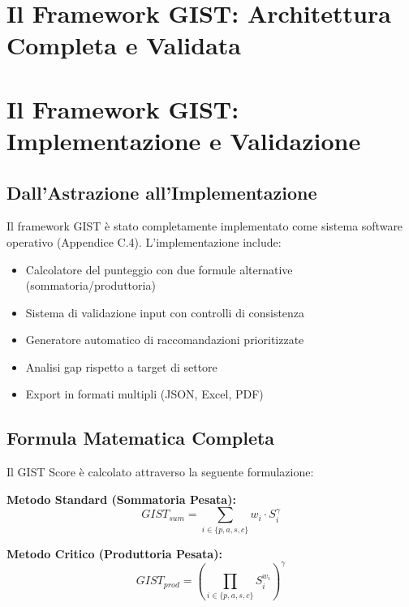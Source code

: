 \section{\texorpdfstring{Il Framework GIST: Architettura Completa e Validata}{5.3 - Il Framework GIST: Architettura Completa e Validata}}
\label{sec:5.3}

\section{\texorpdfstring{Il Framework GIST: Implementazione e Validazione}{5.3 - Il Framework GIST: Implementazione e Validazione}}

\subsection{\texorpdfstring{Dall'Astrazione all'Implementazione}{5.3.1 - Dall'Astrazione all'Implementazione}}

Il framework GIST è stato completamente implementato come sistema software operativo (Appendice C.4). L'implementazione include:

\begin{itemize}
\item Calcolatore del punteggio con due formule alternative (sommatoria/produttoria)
\item Sistema di validazione input con controlli di consistenza
\item Generatore automatico di raccomandazioni prioritizzate
\item Analisi gap rispetto a target di settore
\item Export in formati multipli (JSON, Excel, PDF)
\end{itemize}

\subsection{\texorpdfstring{Formula Matematica Completa}{5.3.2 - Formula Matematica Completa}}

Il GIST Score è calcolato attraverso la seguente formulazione:

\textbf{Metodo Standard (Sommatoria Pesata):}
\begin{equation}
GIST_{sum} = \sum_{i \in \{p,a,s,c\}} w_i \cdot S_i^{\gamma}
\end{equation}

\textbf{Metodo Critico (Produttoria Pesata):}
\begin{equation}
GIST_{prod} = \left(\prod_{i \in \{p,a,s,c\}} S_i^{w_i}\right)^{\gamma}
\end{equation}


